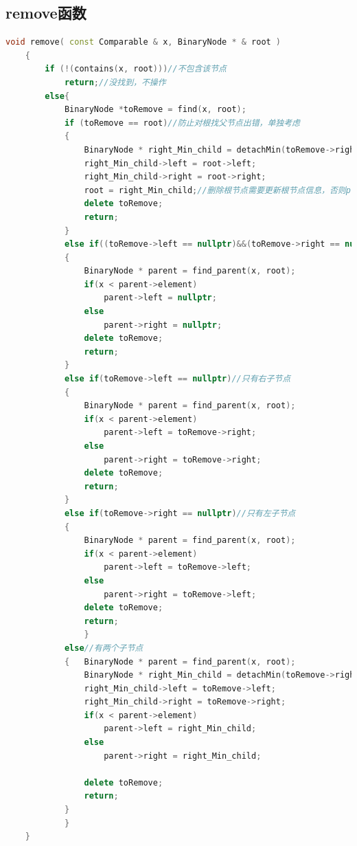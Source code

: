 \documentclass[UTF8]{ctexart}
\begin{document}
\subsection{remove函数}
\begin{lstlisting}[language=C++]
     void remove( const Comparable & x, BinaryNode * & root )
    {
        if (!(contains(x, root)))//不包含该节点
            return;//没找到，不操作
        else{
            BinaryNode *toRemove = find(x, root);
            if (toRemove == root)//防止对根找父节点出错，单独考虑
            {
                BinaryNode * right_Min_child = detachMin(toRemove->right);
                right_Min_child->left = root->left;
                right_Min_child->right = root->right;
                root = right_Min_child;//删除根节点需要更新根节点信息，否则print操作无法实现
                delete toRemove;
                return;
            }
            else if((toRemove->left == nullptr)&&(toRemove->right == nullptr))//叶子
            {
                BinaryNode * parent = find_parent(x, root);
                if(x < parent->element)
                    parent->left = nullptr;
                else
                    parent->right = nullptr;
                delete toRemove;
                return;
            }
            else if(toRemove->left == nullptr)//只有右子节点
            {
                BinaryNode * parent = find_parent(x, root);
                if(x < parent->element)
                    parent->left = toRemove->right;
                else
                    parent->right = toRemove->right;
                delete toRemove;
                return;
            }
            else if(toRemove->right == nullptr)//只有左子节点
            {
                BinaryNode * parent = find_parent(x, root);
                if(x < parent->element)
                    parent->left = toRemove->left;
                else
                    parent->right = toRemove->left;
                delete toRemove;
                return;
                }
            else//有两个子节点
            {   BinaryNode * parent = find_parent(x, root);
                BinaryNode * right_Min_child = detachMin(toRemove->right);
                right_Min_child->left = toRemove->left;
                right_Min_child->right = toRemove->right;     
                if(x < parent->element)
                    parent->left = right_Min_child;
                else
                    parent->right = right_Min_child;

                delete toRemove;
                return;
            }
            }
    }
\end{lstlisting}
\end{document}
